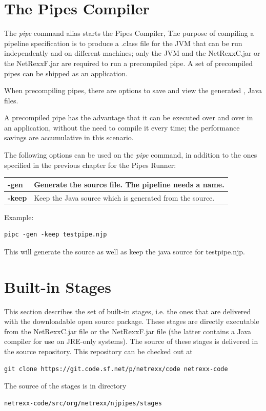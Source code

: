 \chapter{The Pipes Compiler}
The \emph{pipc} command alias starts the Pipes Compiler,
The purpose of compiling a pipeline specification is to produce a
.class file for the JVM that can be run independently and on different
machines; only the JVM and the NetRexxC.jar or the NetRexxF.jar are
required to run a precompiled pipe. A set of precompiled pipes can be
shipped as an application.

When precompiling pipes, there are options to save and view the
generated \nr{}, Java files.

A precompiled pipe has
the advantage that it can be executed over and over in an application,
without the need to compile it every time; the performance savings are
accumulative in this scenario.

The following options can be used on the \emph{pipc} command, in
addition to the ones specified in the previous chapter for the Pipes Runner:

\begin{tabularx}{\textwidth}{>{\bfseries}lX}
\toprule
-gen&Generate the \nr{} source file. The pipeline needs a name.
\\\midrule
-keep&Keep the Java source which is generated from the \nr{} source.
\\\bottomrule
\end{tabularx}

Example:
\begin{lstlisting}
pipc -gen -keep testpipe.njp
\end{lstlisting}
This will generate the \nr{} source as well as keep the java source for testpipe.njp.


\chapter{Built-in Stages} \label{BuiltinStages} 
This section describes the set of built-in stages, i.e. the ones that
are delivered with the downloadable open source package. These stages
are directly executable from the NetRexxC.jar file or the NetRexxF.jar
file (the latter contains a Java compiler for use on JRE-only
systems).
The source of these stages is delivered in the \nr{}
source repository. This repository can be checked out at
\begin{lstlisting}
git clone https://git.code.sf.net/p/netrexx/code netrexx-code
\end{lstlisting}
The source of the stages is in directory
\begin{lstlisting}
netrexx-code/src/org/netrexx/njpipes/stages
\end{lstlisting}

